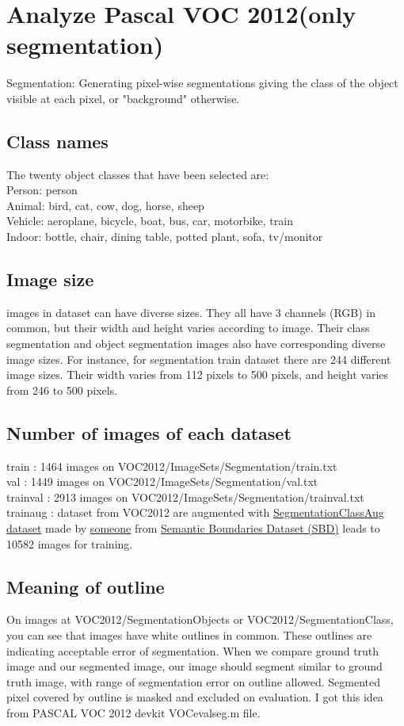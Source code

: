 \documentclass{article}
\begin{document}
\pagestyle{fancy}

\section{Analyze Pascal VOC 2012(only segmentation)}
Segmentation: Generating pixel-wise segmentations giving the class of the object visible at each pixel, or "background" otherwise.
\subsection{Class names}
The twenty object classes that have been selected are:\\
Person: person\\
Animal: bird, cat, cow, dog, horse, sheep\\
Vehicle: aeroplane, bicycle, boat, bus, car, motorbike, train\\
Indoor: bottle, chair, dining table, potted plant, sofa, tv/monitor
\subsection{Image size}
images in dataset can have diverse sizes. They all have 3 channels (RGB) in common, but their width and height varies according to image. Their class segmentation and object segmentation images also have corresponding diverse image sizes. For instance, for segmentation train dataset there are 244 different image sizes. Their width varies from 112 pixels to 500 pixels, and height varies from 246 to 500 pixels.
\subsection{Number of images of each dataset}
train : 1464 images on VOC2012/ImageSets/Segmentation/train.txt\\
val : 1449 images on VOC2012/ImageSets/Segmentation/val.txt\\
trainval : 2913 images on VOC2012/ImageSets/Segmentation/trainval.txt\\
trainaug : dataset from VOC2012 are augmented with \href{https://www.dropbox.com/s/oeu149j8qtbs1x0/SegmentationClassAug.zip?dl=0}{SegmentationClassAug dataset} made by \href{https://github.com/DrSleep/tensorflow-deeplab-resnet}{someone} from \href{http://home.bharathh.info/pubs/codes/SBD/download.html}{Semantic Boundaries Dataset (SBD)} leads to 10582 images for training.\\
\subsection{Meaning of outline}
On images at VOC2012/SegmentationObjects or VOC2012/SegmentationClass, you can see that images have white outlines in common. These outlines are indicating acceptable error of segmentation. When we compare ground truth image and our segmented image, our image should segment similar to ground truth image, with range of segmentation error on outline allowed. Segmented pixel covered by outline is masked and excluded on evaluation. I got this idea from PASCAL VOC 2012 devkit VOCevalseg.m file. \\
\end{document}
